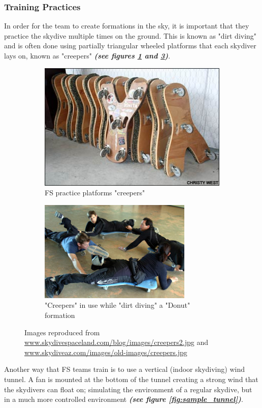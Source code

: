 \documentclass[a4paper, 12pt]{article}
\begin{document}
	\subsubsection{Training Practices}
In order for the team to create formations in the sky, it is important that they practice the skydive multiple times on the ground. This is known as "dirt diving" and is often done using partially triangular wheeled platforms that each skydiver lays on, known as "creepers"  \textbf{\emph{(see figures \ref{fig:creepers} and \ref{fig:creepers_use})}}.
\begin{figure}[H]
	\centering
	\begin{subfigure}{.5\textwidth}
		\centering
		\includegraphics[width=0.9\linewidth]{creepers.jpg}
		\caption{FS practice platforms "creepers"}
		\label{fig:creepers}
	\end{subfigure}%
	\begin{subfigure}{.5\textwidth}
		\centering
		\includegraphics[width=0.9\linewidth]{creepers_use.jpg}
		\caption{"Creepers" in use while "dirt diving" a "Donut" formation}
		\label{fig:creepers_use}
	\end{subfigure}
	\caption{Images reproduced from \url{www.skydivespaceland.com/blog/images/creepers2.jpg} and \url{www.skydiveaz.com/images/old-images/creepers.jpg}}
\end{figure}
%
\noindent Another way that FS teams train is to use a vertical (indoor skydiving) wind tunnel. A fan is mounted at the bottom of the tunnel creating a strong wind that the skydivers can float on; simulating the environment of a regular skydive, but in a much more controlled environment \textbf{\emph{(see figure \ref{fig:sample_tunnel})}}.
\end{document}
